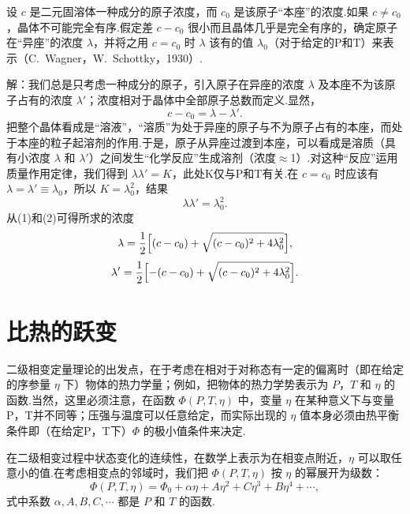 \begin{xiti}

设 $c$ 是二元固溶体一种成分的原子浓度，而 $c_0$ 是该原子“本座”的浓度.如果 $c\neq c_0$，晶体不可能完全有序.假定差 $c-c_0$ 很小而且晶体几乎是完全有序的，确定原子在“异座”的浓度 $\lambda$，并将之用 $c=c_0$ 时 $\lambda$ 该有的值 $\lambda_0$（对于给定的P和T）来表示（C.~Wagner，W.~Schottky，1930）.

解：我们总是只考虑一种成分的原子，引入原子在异座的浓度 $\lambda$ 及本座不为该原子占有的浓度 $\lambda'$；浓度相对于晶体中全部原子总数而定义.显然，
\begin{equation}
  c-c_0=\lambda-\lambda'.\tag{1}
\end{equation}
把整个晶体看成是“溶液”，“溶质”为处于异座的原子与不为原子占有的本座，而处于本座的粒子起溶剂的作用.于是，原子从异座过渡到本座，可以看成是溶质（具有小浓度 $\lambda$ 和 $\lambda'$）之间发生“化学反应”生成溶剂（浓度$\approx$1）.对这种“反应”运用质量作用定律，我们得到 $\lambda\lambda'=K$，此处K仅与P和T有关.在 $c=c_0$ 时应该有 $\lambda=\lambda'\equiv\lambda_0$，所以 $K=\lambda_0^2$，结果
\begin{equation}
  \lambda\lambda'=\lambda_0^2.\tag{2}
\end{equation}
从(1)和(2)可得所求的浓度
\begin{equation*}
  \lambda=\frac{1}{2}\Bigl[(c-c_0)+\sqrt{(c-c_0)^2+4\lambda_0^2}\Bigr],
\end{equation*}
\begin{equation*}
  \lambda'=\frac{1}{2}\Bigl[-(c-c_0)+\sqrt{(c-c_0)^2+4\lambda_0^2}\Bigr].
\end{equation*}

\end{xiti}

\section{比热的跃变}

二级相变定量理论的出发点，在于考虑在相对于对称态有一定的偏离时（即在给定的序参量 $\eta$ 下）物体的热力学量；例如，把物体的热力学势表示为 $P$，$T$ 和 $\eta$ 的函数.当然，这里必须注意，在函数 $\Phi(P,T,\eta)$ 中，变量 $\eta$ 在某种意义下与变量P，T并不同等；压强与温度可以任意给定，而实际出现的 $\eta$ 值本身必须由热平衡条件即（在给定P，T下）$\Phi$ 的极小值条件来决定.

在二级相变过程中状态变化的连续性，在数学上表示为在相变点附近，$\eta$ 可以取任意小的值.在考虑相变点的邻域时，我们把 $\Phi(P,T,\eta)$ 按 $\eta$ 的幂展开为级数：
\begin{equation}
  \Phi(P,T,\eta)=\Phi_0+\alpha\eta+A\eta^2+C\eta^3+B\eta^4+\cdots,
\end{equation}
式中系数 $\alpha,A,B,C,\cdots$ 都是 $P$ 和 $T$ 的函数.

